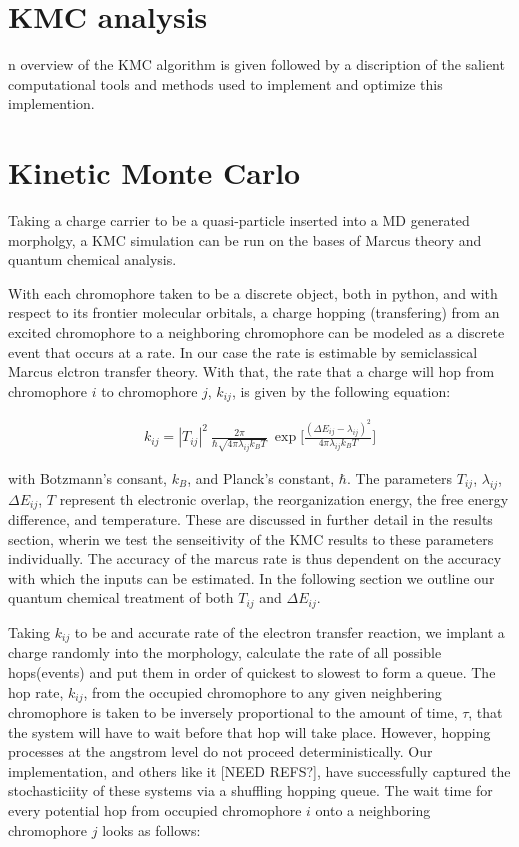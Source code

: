 \section{KMC analysis}

n overview of the KMC algorithm is given followed by a discription of the salient computational tools and
methods used to implement and optimize this implemention. 

\section{Kinetic Monte Carlo}

Taking a charge carrier to be a quasi-particle inserted into a MD generated morpholgy, a KMC
simulation can be run on the bases of Marcus theory and quantum chemical analysis.

With each chromophore taken to be a discrete object, both in python, and with respect to its frontier
molecular orbitals, a charge hopping (transfering) from an excited chromophore to a neighboring chromophore can be modeled
as a discrete event that occurs at a rate. In our case the rate is estimable by semiclassical Marcus elctron transfer theory. With that,
the rate that a charge
will hop from chromophore $i$ to chromophore $j$, $k_{ij}$, is given by the
following equation:

\begin{align}
    k_{ij}  =  |T_{ij}|^2\ \frac{2\pi}{\hbar \sqrt{4 \pi \lambda_{ij} k_{B} T}}\ \exp{\Bigg[ \frac{(\Delta
    E_{ij} - \lambda_{ij})^2}{ 4 \pi \lambda_{ij} k_{B} T} \Bigg] }
\end{align}

with Botzmann's consant, $k_{B}$, and Planck's constant, $\hbar$. The parameters $T_{ij}$, $\lambda_{ij}$,
$\Delta E_{ij}$, $T$ represent th electronic overlap, the reorganization energy, the free energy difference, and
temperature. These are discussed in further detail in the results section, wherin we test the senseitivity of
the KMC results to these parameters individually. 
The accuracy of the marcus rate is thus dependent on the accuracy with which the inputs can be estimated. In
the following section we outline our quantum chemical treatment of both $T_{ij}$ and $\Delta E_{ij}$.

Taking $k_{ij}$ to be and
accurate rate of the electron transfer reaction, we implant a charge randomly into the morphology, calculate
the rate of all possible hops(events)
and put them in order of quickest to slowest to form a queue. The hop rate, $k_{ij}$, from the occupied chromophore to any
given neighbering chromophore is taken to be
inversely proportional to the amount of time, $\tau$, that the system will have to wait before that hop will
take place. However, hopping processes at the angstrom level do not proceed deterministically. 
Our implementation, and others like it [NEED REFS?], have
successfully captured the stochasticiity of these systems via a shuffling hopping queue.
The wait time for every potential hop from occupied chromophore $i$ onto a
neighboring chromophore $j$ looks as follows:

